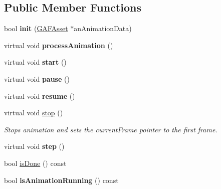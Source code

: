 \subsection*{Public Member Functions}
\begin{DoxyCompactItemize}
\item 
\hypertarget{class_g_a_f_1_1_g_a_f_animation_ad410402f6fad09729559a1abd7d48a9c}{bool {\bfseries init} (\hyperlink{class_g_a_f_1_1_g_a_f_asset}{G\-A\-F\-Asset} $\ast$an\-Animation\-Data)}\label{class_g_a_f_1_1_g_a_f_animation_ad410402f6fad09729559a1abd7d48a9c}

\item 
\hypertarget{class_g_a_f_1_1_g_a_f_animation_a62cc9254f7ebf0a7f47ae21536bebc3a}{virtual void {\bfseries process\-Animation} ()}\label{class_g_a_f_1_1_g_a_f_animation_a62cc9254f7ebf0a7f47ae21536bebc3a}

\item 
\hypertarget{class_g_a_f_1_1_g_a_f_animation_a4a80038816578473a98184d7f5441240}{virtual void {\bfseries start} ()}\label{class_g_a_f_1_1_g_a_f_animation_a4a80038816578473a98184d7f5441240}

\item 
\hypertarget{class_g_a_f_1_1_g_a_f_animation_a2f7f1038c4964b50398bdb3bcb209fda}{virtual void {\bfseries pause} ()}\label{class_g_a_f_1_1_g_a_f_animation_a2f7f1038c4964b50398bdb3bcb209fda}

\item 
\hypertarget{class_g_a_f_1_1_g_a_f_animation_a7269d57c04597b93790c5835e6d76fee}{virtual void {\bfseries resume} ()}\label{class_g_a_f_1_1_g_a_f_animation_a7269d57c04597b93790c5835e6d76fee}

\item 
\hypertarget{class_g_a_f_1_1_g_a_f_animation_a5651703f8d875d4cd64d966cd8ff1464}{virtual void \hyperlink{class_g_a_f_1_1_g_a_f_animation_a5651703f8d875d4cd64d966cd8ff1464}{stop} ()}\label{class_g_a_f_1_1_g_a_f_animation_a5651703f8d875d4cd64d966cd8ff1464}

\begin{DoxyCompactList}\small\item\em Stops animation and sets the current\-Frame pointer to the first frame. \end{DoxyCompactList}\item 
\hypertarget{class_g_a_f_1_1_g_a_f_animation_aebc7d8df72a869a5b05d4746f6cd0a90}{virtual void {\bfseries step} ()}\label{class_g_a_f_1_1_g_a_f_animation_aebc7d8df72a869a5b05d4746f6cd0a90}

\item 
bool \hyperlink{class_g_a_f_1_1_g_a_f_animation_a64a17e6305d1ada5f37d2636ce098816}{is\-Done} () const 
\item 
\hypertarget{class_g_a_f_1_1_g_a_f_animation_a456363aeb317e9259e3442cde27b103c}{bool {\bfseries is\-Animation\-Running} () const }\label{class_g_a_f_1_1_g_a_f_animation_a456363aeb317e9259e3442cde27b103c}


\end{DoxyCompactItemize}
